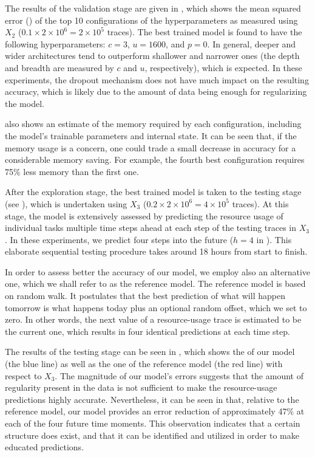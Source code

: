The results of the validation stage are given in , which shows
the mean squared error () of the top 10 configurations of the
hyperparameters as measured using $X_2$ ($0.1 \times 2 \times 10^6 = 2 \times
10^5$ traces). The best trained model is found to have the following
hyperparameters: $c = 3$, $u = 1600$, and $p = 0$. In general, deeper and wider
architectures tend to outperform shallower and narrower ones (the depth and
breadth are measured by $c$ and $u$, respectively), which is expected. In these
experiments, the dropout mechanism does not have much impact on the resulting
accuracy, which is likely due to the amount of data being enough for
regularizing the model.

 also shows an estimate of the memory required by each
configuration, including the model's trainable parameters and internal state. It
can be seen that, if the memory usage is a concern, one could trade a small
decrease in accuracy for a considerable memory saving. For example, the fourth
best configuration requires 75\% less memory than the first one.

After the exploration stage, the best trained model is taken to the testing
stage (see ), which is undertaken using $X_3$ ($0.2 \times 2
\times 10^6 = 4 \times 10^5$ traces). At this stage, the model is extensively
assessed by predicting the resource usage of individual tasks multiple time
steps ahead at each step of the testing traces in $X_3$. In these experiments,
we predict four steps into the future ($h = 4$ in ). This
elaborate sequential testing procedure takes around 18 hours from start to
finish.

In order to assess better the accuracy of our model, we employ also an
alternative one, which we shall refer to as the reference model. The reference
model is based on random walk. It postulates that the best prediction of what
will happen tomorrow is what happens today plus an optional random offset, which
we set to zero. In other words, the next value of a resource-usage trace is
estimated to be the current one, which results in four identical predictions at
each time step.

The results of the testing stage can be seen in , which shows the
 of our model (the blue line) as well as the one of the reference model
(the red line) with respect to $X_3$. The magnitude of our model's errors
suggests that the amount of regularity present in the data is not sufficient to
make the resource-usage predictions highly accurate. Nevertheless, it can be
seen in  that, relative to the reference model, our model provides
an error reduction of approximately 47\% at each of the four future time
moments. This observation indicates that a certain structure does exist, and
that it can be identified and utilized in order to make educated predictions.

